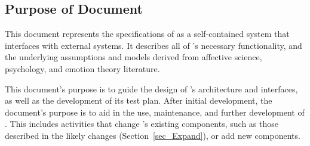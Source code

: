 \subsection{Purpose of Document}\label{sec:doc_purpose}
This document represents the specifications of \progname{} as a self-contained
system that interfaces with external systems. It describes all of \progname{}'s
necessary functionality, and the underlying assumptions and models derived from
affective science, psychology, and emotion theory literature.

This document's purpose is to guide the design of \progname{}'s architecture
and interfaces, as well as the development of its test plan. After initial
development, the document's purpose is to aid in the use, maintenance, and
further development of \progname{}. This includes activities that change
\progname{}'s existing components, such as those described in the likely
changes (Section~\ref{sec_Expand}), or add new components.